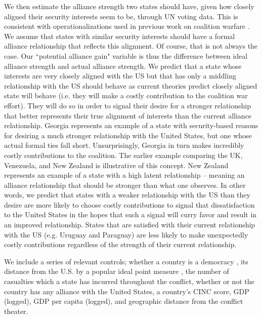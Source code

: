 \documentclass[12pt,letterpaper]{article}
\begin{document}
		We then estimate the alliance strength two states should have, given how closely aligned their security interests seem to be, through UN voting data. This is consistent with operationalizations used in previous work on coalition warfare \citep{wolford_politicsmilitarycoalitions_2015}. We assume that states with similar security interests should have a formal alliance relationship that reflects this alignment. Of course, that is not always the case. Our ``potential alliance gain" variable is thus the difference between ideal alliance strength and actual alliance strength. We predict that a state whose interests are very closely aligned with the US but that has only a middling relationship with the US should behave as current theories predict closely aligned state will behave (i.e. they will make a costly contribution to the coalition war effort). They will do so in order to signal their desire for a stronger relationship that better represents their true alignment of interests than the current alliance relationship. Georgia represents an example of a state with security-based reasons for desiring a much stronger relationship with the United States, but one whose actual formal ties fall short. Unsurprisingly, Georgia in turn makes incredibly costly contributions to the coalition. The earlier example comparing the UK, Venezuela, and New Zealand is illustrative of this concept. New Zealand represents an example of a state with a high latent relationship -- meaning an alliance relationship that should be stronger than what one observes. In other words, we predict that states with a weaker relationship with the US than they desire are more likely to choose costly contributions to signal that dissatisfaction to the United States in the hopes that such a signal will curry favor and result in an improved relationship. States that are satisfied with their current relationship with the US (e.g. Uruguay and Paraguay) are less likely to make unexpectedly costly contributions regardless of the strength of their current relationship.

		We include a series of relevant controls; whether a country is a democracy \citep{gartzke_whydemocraciesmay_2004}, its distance from the U.S. by a popular ideal point measure \citep{bailey_estimatingdynamicstate_2017}, the number of casualties which a state has incurred throughout the conflict, whether or not the country has any alliance with the United States, a country's CINC score, GDP (logged), GDP per capita (logged), and geographic distance from the conflict theater.
		
\end{document}
